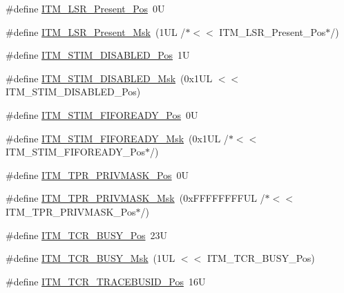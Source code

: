 \begin{DoxyCompactItemize}
\item 
\#define \hyperlink{group___c_m_s_i_s___i_t_m_gaf5740689cf14564d3f3fd91299b6c88d}{I\+T\+M\+\_\+\+L\+S\+R\+\_\+\+Present\+\_\+\+Pos}~0U
\item 
\#define \hyperlink{group___c_m_s_i_s___i_t_m_gaa5bc2a7f5f1d69ff819531f5508bb017}{I\+T\+M\+\_\+\+L\+S\+R\+\_\+\+Present\+\_\+\+Msk}~(1\+U\+L /$\ast$$<$$<$ I\+T\+M\+\_\+\+L\+S\+R\+\_\+\+Present\+\_\+\+Pos$\ast$/)
\item 
\#define \hyperlink{group___c_m_s_i_s___i_t_m_gafd9ed85f36233685f182cc249621e025}{I\+T\+M\+\_\+\+S\+T\+I\+M\+\_\+\+D\+I\+S\+A\+B\+L\+E\+D\+\_\+\+Pos}~1U
\item 
\#define \hyperlink{group___c_m_s_i_s___i_t_m_ga9d8f821bdad48c7b4a02f11ebf2c8852}{I\+T\+M\+\_\+\+S\+T\+I\+M\+\_\+\+D\+I\+S\+A\+B\+L\+E\+D\+\_\+\+Msk}~(0x1\+U\+L $<$$<$ I\+T\+M\+\_\+\+S\+T\+I\+M\+\_\+\+D\+I\+S\+A\+B\+L\+E\+D\+\_\+\+Pos)
\item 
\#define \hyperlink{group___c_m_s_i_s___i_t_m_gaa79f3a59d15d810d48d924c0ca4ae0b9}{I\+T\+M\+\_\+\+S\+T\+I\+M\+\_\+\+F\+I\+F\+O\+R\+E\+A\+D\+Y\+\_\+\+Pos}~0U
\item 
\#define \hyperlink{group___c_m_s_i_s___i_t_m_ga73dc88e3338b4ef9a81e53a1d2c5ae83}{I\+T\+M\+\_\+\+S\+T\+I\+M\+\_\+\+F\+I\+F\+O\+R\+E\+A\+D\+Y\+\_\+\+Msk}~(0x1\+U\+L /$\ast$$<$$<$ I\+T\+M\+\_\+\+S\+T\+I\+M\+\_\+\+F\+I\+F\+O\+R\+E\+A\+D\+Y\+\_\+\+Pos$\ast$/)
\item 
\#define \hyperlink{group___c_m_s_i_s___i_t_m_ga7abe5e590d1611599df87a1884a352e8}{I\+T\+M\+\_\+\+T\+P\+R\+\_\+\+P\+R\+I\+V\+M\+A\+S\+K\+\_\+\+Pos}~0U
\item 
\#define \hyperlink{group___c_m_s_i_s___i_t_m_ga168e089d882df325a387aab3a802a46b}{I\+T\+M\+\_\+\+T\+P\+R\+\_\+\+P\+R\+I\+V\+M\+A\+S\+K\+\_\+\+Msk}~(0x\+F\+F\+F\+F\+F\+F\+F\+F\+U\+L /$\ast$$<$$<$ I\+T\+M\+\_\+\+T\+P\+R\+\_\+\+P\+R\+I\+V\+M\+A\+S\+K\+\_\+\+Pos$\ast$/)
\item 
\#define \hyperlink{group___c_m_s_i_s___i_t_m_ga9174ad4a36052c377cef4e6aba2ed484}{I\+T\+M\+\_\+\+T\+C\+R\+\_\+\+B\+U\+S\+Y\+\_\+\+Pos}~23U
\item 
\#define \hyperlink{group___c_m_s_i_s___i_t_m_ga43ad7cf33de12f2ef3a412d4f354c60f}{I\+T\+M\+\_\+\+T\+C\+R\+\_\+\+B\+U\+S\+Y\+\_\+\+Msk}~(1\+U\+L $<$$<$ I\+T\+M\+\_\+\+T\+C\+R\+\_\+\+B\+U\+S\+Y\+\_\+\+Pos)
\item 
\#define \hyperlink{group___c_m_s_i_s___i_t_m_ga113bf41ed31584360ad7d865e5e0ace7}{I\+T\+M\+\_\+\+T\+C\+R\+\_\+\+T\+R\+A\+C\+E\+B\+U\+S\+I\+D\+\_\+\+Pos}~16U
\item 

\end{DoxyCompactItemize}
